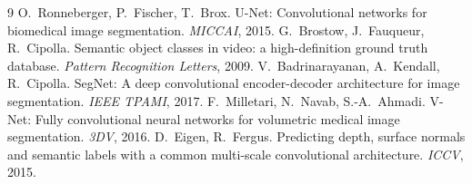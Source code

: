 \documentclass[10pt,a4paper,twocolumn]{article}
\begin{document}
\begingroup\footnotesize
\renewcommand{\section}[2]{\vspace{2pt}\noindent\textbf{Referências}\par}
\begin{thebibliography}{9}\setlength{\itemsep}{0pt}
 O.~Ronneberger, P.~Fischer, T.~Brox. U-Net: Convolutional networks for
biomedical image segmentation. \emph{MICCAI}, 2015.
 G.~Brostow, J.~Fauqueur, R.~Cipolla. Semantic object classes in video:
a high-definition ground truth database. \emph{Pattern Recognition Letters}, 2009.
 V.~Badrinarayanan, A.~Kendall, R.~Cipolla. SegNet: A deep convolutional
encoder-decoder architecture for image segmentation. \emph{IEEE TPAMI}, 2017.
 F.~Milletari, N.~Navab, S.-A.~Ahmadi. V-Net: Fully convolutional neural
networks for volumetric medical image segmentation. \emph{3DV}, 2016.
 D.~Eigen, R.~Fergus. Predicting depth, surface normals and semantic labels
with a common multi-scale convolutional architecture. \emph{ICCV}, 2015.
\end{thebibliography}
\endgroup
\end{document}
